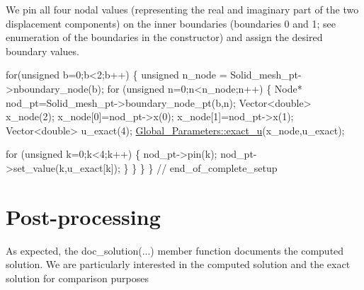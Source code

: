 We pin all four nodal values (representing the real and imaginary part of the two displacement components) on the inner boundaries (boundaries 0 and 1; see enumeration of the boundaries in the constructor) and assign the desired boundary values.


\begin{DoxyCodeInclude}
 \textcolor{keywordflow}{for}(\textcolor{keywordtype}{unsigned} b=0;b<2;b++)
  \{
   \textcolor{keywordtype}{unsigned} n\_node = Solid\_mesh\_pt->nboundary\_node(b);
   \textcolor{keywordflow}{for} (\textcolor{keywordtype}{unsigned} n=0;n<n\_node;n++)
    \{
       Node* nod\_pt=Solid\_mesh\_pt->boundary\_node\_pt(b,n);
       Vector<double> x\_node(2);
       x\_node[0]=nod\_pt->x(0);
       x\_node[1]=nod\_pt->x(1);
       Vector<double> u\_exact(4);
       \hyperlink{namespaceGlobal__Parameters_a97162dba4bd29a15067b9c9bbe53c754}{Global\_Parameters::exact\_u}(x\_node,u\_exact);

       \textcolor{keywordflow}{for} (\textcolor{keywordtype}{unsigned} k=0;k<4;k++)
        \{
         nod\_pt->pin(k);
         nod\_pt->set\_value(k,u\_exact[k]);
        \}
    \}
  \}
\} \textcolor{comment}{// end\_of\_complete\_setup}

\end{DoxyCodeInclude}




 

\hypertarget{index_doc}{}\section{Post-\/processing}\label{index_doc}
As expected, the {\ttfamily doc\+\_\+solution}(...) member function documents the computed solution. We are particularly interested in the computed solution and the exact solution for comparison purposes

 





